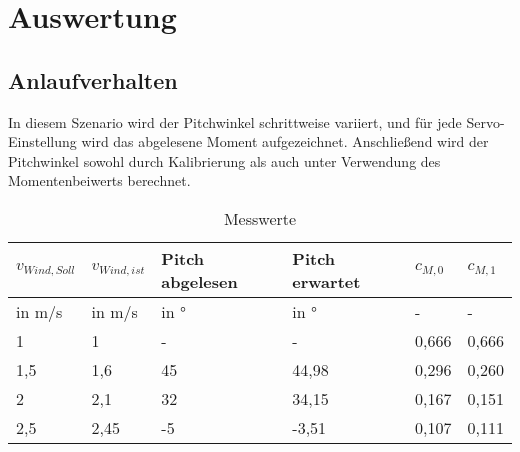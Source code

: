 \section{Auswertung}
\label{sec:Auswertung}
\subsection{Anlaufverhalten}
In diesem Szenario wird der Pitchwinkel schrittweise variiert, und für jede Servo-Einstellung  wird das abgelesene Moment aufgezeichnet. Anschließend wird der Pitchwinkel sowohl durch Kalibrierung als auch unter Verwendung des Momentenbeiwerts berechnet.
\begin{table}[ht!]
    \centering
    \caption{Messwerte}
    \label{tab_Messwerte_Anlauf_230615}
    \begin{tabular}{|l|l|l|l|l|l|}
        \hline
        \rowcolor[HTML]{70AD47} 
        {\color[HTML]{FFFFFF} \textbf{$v_{Wind,Soll}$}} & {\color[HTML]{FFFFFF} \textbf{$v_{Wind,ist}$}} & {\color[HTML]{FFFFFF} \textbf{Pitch abgelesen}} & {\color[HTML]{FFFFFF} \textbf{Pitch erwartet}} & {\color[HTML]{FFFFFF} \textbf{$c_{M,0}$}} & {\color[HTML]{FFFFFF} \textbf{$c_{M,1}$}} \\ \hline
        \rowcolor[HTML]{70AD47} 
        in m/s                                         & in m/s                                      & in °                                            & in °                                           & -                                      & -                                      \\ \hline
        \rowcolor[HTML]{E2EFDA} 
        1                                              & 1                                           & -                                               & -                                              & 0,666                                  & 0,666                                  \\ \hline
        \rowcolor[HTML]{C6E0B4} 
        1,5                                            & 1,6                                         & 45                                              & 44,98                                              & 0,296                                  & 0,260                                  \\ \hline
        \rowcolor[HTML]{E2EFDA} 
        2                                              & 2,1                                         & 32                                              & 34,15                                              & 0,167                                  & 0,151                                  \\ \hline
        \rowcolor[HTML]{C6E0B4} 
        2,5                                            & 2,45                                        & -5                                              & -3,51                                       & 0,107                                  & 0,111                                  \\ \hline
    \end{tabular}
\end{table}

